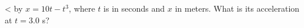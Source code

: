  <%
by $x=10t-t^3$, where $t$ is in seconds and $x$ in meters.
What is its acceleration at $t=3.0$ s?
